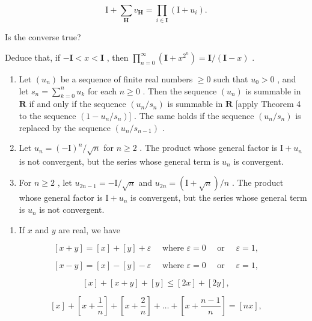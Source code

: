 \[
\mathrm{I} + \sum_ {\mathbf {H}} v _ {\mathbf {H}} = \prod_ {i \in \mathbf {I}} (\mathrm{I} + u _ {i}).
\]

Is the converse true?

Deduce that, if \(-\mathbf{I} < x < \mathbf{I}\) , then \(\prod_{n=0}^{\infty} (\mathbf{I} + x^{2^n}) = \mathbf{I} / (\mathbf{I} - x)\) .

\begin{enumerate}
\def\labelenumi{\arabic{enumi})}
\setcounter{enumi}{19}
\item
  Let \((u_n)\) be a sequence of finite real numbers \(\geqslant 0\) such that \(u_0 > 0\) , and let \(s_n = \sum_{k=0}^{n} u_k\) for each \(n \geqslant 0\) . Then the sequence \((u_n)\) is summable in \(\mathbf{R}\) if and only if the sequence \((u_n / s_n)\) is summable in \(\mathbf{R}\) {[}apply Theorem 4 to the sequence \((1 - u_n / s_n)]\) . The same holds if the sequence \((u_n / s_n)\) is replaced by the sequence \((u_n / s_{n-1})\) .
\item
  Let \(u_{n} = (-\mathrm{I})^{n} / \sqrt{n}\) for \(n \geqslant 2\) . The product whose general factor is \(\mathrm{I} + u_{n}\) is not convergent, but the series whose general term is \(u_{n}\) is convergent.
\item
  For \(n \geqslant 2\) , let \(u_{2n-1} = -\mathrm{I}/\sqrt{n}\) and \(u_{2n} = (\mathrm{I} + \sqrt{n})/n\) . The product whose general factor is \(\mathrm{I} + u_n\) is convergent, but the series whose general term is \(u_n\) is not convergent.
\end{enumerate}

\BourbakiExerciseGroup

\begin{enumerate}
\def\labelenumi{\arabic{enumi})}
\tightlist
\item
  If \(x\) and \(y\) are real, we have
\end{enumerate}

\[
[ x + y ] = [ x ] + [ y ] + \varepsilon \quad \text { where } \varepsilon = 0 \quad \text { or } \quad \varepsilon = 1,
\]

\[
[ x - y ] = [ x ] - [ y ] - \varepsilon \quad \text { where } \varepsilon = 0 \quad \text { or } \quad \varepsilon = 1,
\]

\[
[ x ] + [ x + y ] + [ y ] \leqslant [ 2 x ] + [ 2 y ],
\]

\[
[ x ] + \left[ x + \frac {1}{n} \right] + \left[ x + \frac {2}{n} \right] + \dots + \left[ x + \frac {n - 1}{n} \right] = [ n x ],
\]

